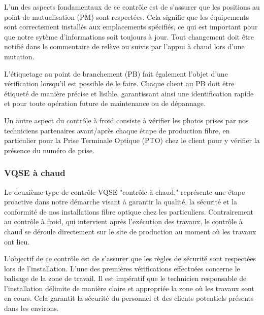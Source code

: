 \documentclass[12pt, a4paper]{article}
\begin{document}
L'un des aspects fondamentaux de ce
contrôle est de s'assurer que les positions
au point de mutualisation (PM) sont
respectées. Cela signifie que les
équipements sont correctement
installés aux emplacements spécifiés,
ce qui est important pour que notre sytème 
d'informations soit toujours à jour. Tout changement
doit être notifié dans le commentaire de relève 
ou suivis par l'appui à chaud lors d'une mutation.

L'étiquetage au point de branchement (PB) fait
également l'objet d'une vérification lorsqu'il
est possible de le faire. Chaque client au PB doit
être étiqueté de manière précise et lisible,
garantissant ainsi une identification rapide
et pour toute opération future de
maintenance ou de dépannage.

Un autre aspect du contrôle à froid
consiste à vérifier les photos prises
par nos techniciens partenaires avant/après
chaque étape de production fibre, en
particulier pour la Prise Terminale
Optique (PTO) chez le client pour y vérifier
la présence du numéro de prise.  


\subsubsection{VQSE à chaud}
Le deuxième type de contrôle VQSE "contrôle à chaud,"
représente une étape proactive
dans notre démarche visant à garantir la qualité,
la sécurité et la conformité de nos installations
fibre optique chez les particuliers.
Contrairement au contrôle à froid, qui
intervient après l'exécution des travaux,
le contrôle à chaud se déroule directement
sur le site de production au moment où les
travaux ont lieu.

L'objectif de ce contrôle est
de s'assurer que les règles de sécurité
sont respectées lors de l'installation.
L'une des premières vérifications effectuées
concerne le balisage de la zone de travail.
Il est impératif que le technicien
responsable de l'installation délimite
de manière claire et appropriée la zone
où les travaux sont en cours. Cela garantit
la sécurité du personnel et des clients
potentiels présents dans les environs.
\newpage
\end{document}
